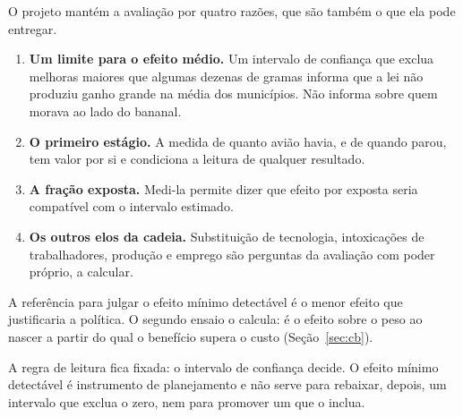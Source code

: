 O projeto mantém a avaliação por quatro razões, que são também o que ela pode
entregar.

\begin{enumerate}
\item \textbf{Um limite para o efeito médio.} Um intervalo de confiança que
exclua melhoras maiores que algumas dezenas de gramas informa que a lei não
produziu ganho grande na média dos municípios. Não informa sobre quem morava ao
lado do bananal.
\item \textbf{O primeiro estágio.} A medida de quanto avião havia, e de quando
parou, tem valor por si e condiciona a leitura de qualquer resultado.
\item \textbf{A fração exposta.} Medi-la permite dizer que efeito por exposta
seria compatível com o intervalo estimado.
\item \textbf{Os outros elos da cadeia.} Substituição de tecnologia,
intoxicações de trabalhadores, produção e emprego são perguntas da avaliação
com poder próprio, a calcular.
\end{enumerate}

A referência para julgar o efeito mínimo detectável é o menor efeito que
justificaria a política. O segundo ensaio o calcula: é o efeito sobre o peso ao
nascer a partir do qual o benefício supera o custo
(Seção~\ref{sec:cb}).

A regra de leitura fica fixada: o intervalo de confiança decide. O efeito mínimo
detectável é instrumento de planejamento e não serve para rebaixar, depois, um
intervalo que exclua o zero, nem para promover um que o inclua.
